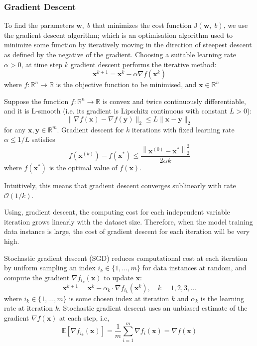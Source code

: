 \documentclass{beamer}
\begin{document}
\begin{frame}[allowframebreaks]
\frametitle{Gradient Descent}
To find the parameters $\bm{w},\;b$ that minimizes the cost function $\mathrm{J}(\bm{w},\;b)$, we use the gradient descent algorithm; which is an optimisation algorithm used to minimize some function by iteratively moving in the direction of steepest descent as defined by the negative of the gradient. Choosing a suitable learning rate $\alpha > 0$, at time step $k$ gradient descent performs the iterative method:
\begin{equation}\label{eqn:gd}
\bm{x}^{k+1} = \bm{x}^k - \alpha \nabla f(\bm{x}^k)
\end{equation}
where $f:\mathbb{R}^n \rightarrow \mathbb{R}$ is the objective function to be minimised, and $\bm{x} \in \mathbb{R}^n$
\begin{theorem}
Suppose the function $f: \mathbb{R}^{n} \rightarrow \mathbb{R}$ is convex and twice continuously differentiable, and it is L-smooth (i.e. its gradient is Lipschitz continuous with constant $L>0$): 
\begin{equation}\label{eqn:lipschitz}
\|\nabla f(\bm{x})-\nabla f(\bm{y})\|_{2} \leq L\|\bm{x}-\bm{y}\|_{2}
\end{equation}
for any $\bm{x}, \bm{y}\in \mathbb{R}^m$. Gradient descent for $k$ iterations with  fixed learning rate $\alpha \leq 1 / L$  satisfies
\begin{equation}\label{eqn:sublinear_conv}
f\left(\bm{x}^{(k)}\right)-f\left(\bm{x}^{*}\right) \leq \frac{\left\|\bm{x}^{(0)}-\bm{x}^{*}\right\|_{2}^{2}}{2 \alpha k}
\end{equation}
where $f\left(\bm{x}^{*}\right)$ is the optimal value of $f(\bm{x})$. 
\end{theorem}
Intuitively, this means that gradient descent converges sublinearly with rate $\mathcal{O}(1 / k)$.

Using, gradient descent, the computing cost for each independent variable iteration grows linearly with the dataset size. Therefore, when the model training data instance is large, the cost of gradient descent for each iteration will be very high.

Stochastic gradient descent (SGD) reduces computational cost at each iteration by uniform sampling an index $i_k \in\{1, \ldots, m\}$ for data instances at random, and compute the gradient $\nabla f_{i_{k}}(\bm{x})$ to update $\bm{x}$:
\begin{equation}\label{eqn:sgd}
\bm{x}^{k+1}=\bm{x}^{k}- \alpha_k \cdot \nabla f_{i_{k}}\left(\bm{x}^{k}\right), \quad k=1,2,3, \ldots
\end{equation}
where $i_{k} \in\{1, \ldots, m\}$ is some chosen index at iteration $k$ and $\alpha_k$ is the learning rate at iteration $k$. Stochastic gradient descent uses an unbiased estimate of the gradient $\nabla f(\bm{x})$ at each step, i.e,
\begin{equation}\label{eqn:sgd_est}
\mathbb{E}[\nabla f_{i_{k}}(\bm{x})]=\frac{1}{m} \sum_{i=1}^{m} \nabla f_{i}(\bm{x})  = \nabla f(\bm{x})
\end{equation}


\end{frame}
\end{document}
